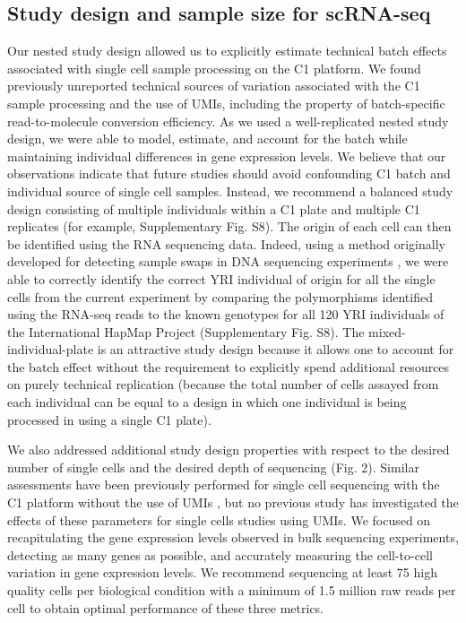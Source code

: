 \subsection{Study design and sample size for
scRNA-seq}\label{study-design-and-sample-size-for-scrna-seq}

Our nested study design allowed us to explicitly estimate technical
batch effects associated with single cell sample processing on the C1
platform. We found previously unreported technical sources of variation
associated with the C1 sample processing and the use of UMIs, including
the property of batch-specific read-to-molecule conversion efficiency.
As we used a well-replicated nested study design, we were able to model,
estimate, and account for the batch while maintaining individual
differences in gene expression levels. We believe that our observations
indicate that future studies should avoid confounding C1 batch and
individual source of single cell samples. Instead, we recommend a
balanced study design consisting of multiple individuals within a C1
plate and multiple C1 replicates (for example, Supplementary Fig. S8).
The origin of each cell can then be identified using the RNA sequencing
data. Indeed, using a method originally developed for detecting sample
swaps in DNA sequencing experiments \citep{Jun2012}, we were able to
correctly identify the correct YRI individual of origin for all the
single cells from the current experiment by comparing the polymorphisms
identified using the RNA-seq reads to the known genotypes for all 120
YRI individuals of the International HapMap Project
\citep{HapMapConsortium2005} (Supplementary Fig. S8). The
mixed-individual-plate is an attractive study design because it allows
one to account for the batch effect without the requirement to
explicitly spend additional resources on purely technical replication
(because the total number of cells assayed from each individual can be
equal to a design in which one individual is being processed in using a
single C1 plate).

We also addressed additional study design properties with respect to the
desired number of single cells and the desired depth of sequencing (Fig.
2). Similar assessments have been previously performed for single cell
sequencing with the C1 platform without the use of UMIs \citep{Wu2014,
Pollen2014}, but no previous study has investigated the effects of
these parameters for single cells studies using UMIs. We focused on
recapitulating the gene expression levels observed in bulk sequencing
experiments, detecting as many genes as possible, and accurately
measuring the cell-to-cell variation in gene expression levels. We
recommend sequencing at least 75 high quality cells per biological
condition with a minimum of 1.5 million raw reads per cell to obtain
optimal performance of these three metrics.

